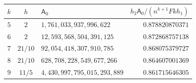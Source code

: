 \begin{tabular}{@{}cclr@{}}
\toprule
$k$ & $h$ & $\mathsf{A}_0$ & $h_2\mathsf{A}_0/(n^{k+1}Fkh_1)$ \\
\midrule
$5$ & $2$ & $1{,}761{,}033{,}937{,}996{,}622$ & $0.878820870371$ \\
$6$ & $2$ & $12{,}593{,}568{,}504{,}391{,}125$ & $0.872868757138$ \\
$7$ & $21/10$ & $92{,}054{,}418{,}307{,}910{,}785$ & $0.868075379727$ \\
$8$ & $21/10$ & $628{,}708{,}228{,}549{,}677{,}266$ & $0.864607001369$ \\
$9$ & $11/5$ & $4{,}430{,}997{,}795{,}015{,}293{,}889$ & $0.861715646305$ \\
\bottomrule
\end{tabular}

